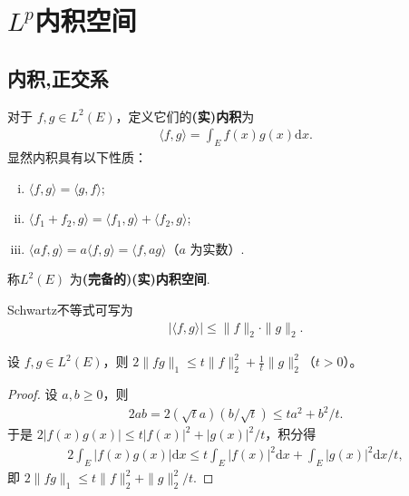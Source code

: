 \documentclass[../../main.tex]{subfiles}%
\begin{document}
\section{$L^p$内积空间}

\subsection{内积,正交系}

\begin{definition}
对于 $f, g \in L^2(E)$，定义它们的\textbf{(实)内积}为
\begin{align*}
\langle f, g \rangle = \int_E f(x) g(x) \mathrm{d}x.
\end{align*}
显然内积具有以下性质：
\begin{enumerate}[(i)]
\item $\langle f, g \rangle = \langle g, f \rangle$;
\item $\langle f_1 + f_2, g \rangle = \langle f_1, g \rangle + \langle f_2, g \rangle$;
\item $\langle af, g \rangle = a\langle f, g \rangle = \langle f, ag \rangle$（$a$ 为实数）.
\end{enumerate}
称$L^2(E)$ 为\textbf{(完备的)(实)内积空间}.
\end{definition}
\begin{remark}
Schwartz不等式可写为
\begin{align*}
|\langle f, g \rangle| \leqslant \|f\|_2 \cdot \|g\|_2.
\end{align*}
\end{remark}

\begin{example}
设 $f, g \in L^2(E)$，则 $2\|fg\|_1 \leqslant t\|f\|_2^2 + \frac{1}{t}\|g\|_2^2$（$t>0$）。
\end{example}
\begin{proof}
设 $a, b \geqslant 0$，则
\begin{align*}
2ab = 2(\sqrt{t}a)(b/\sqrt{t}) \leqslant ta^2 + b^2/t.
\end{align*}
于是 $2|f(x)g(x)| \leqslant t|f(x)|^2 + |g(x)|^2/t$，积分得
\begin{align*}
2\int_E |f(x)g(x)| \mathrm{d}x \leqslant t\int_E |f(x)|^2 \mathrm{d}x + \int_E |g(x)|^2 \mathrm{d}x / t,
\end{align*}
即 $2\|fg\|_1 \leqslant t\|f\|_2^2 + \|g\|_2^2 / t$.
\end{proof}
\end{document}
